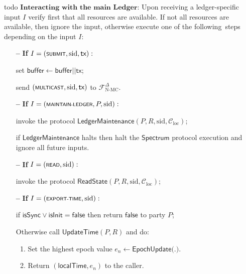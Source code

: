 \begin{protocol}
\begin{algorithmic}
        todo
        \State $\textbf{Interacting with the main Ledger:}$
        Upon receiving a ledger-specific input $I$ verify first that all resources are available.
        If not all resources are available, then ignore the input, otherwise execute one of the following\
        steps depending on the input $I$:
        \begin{itemize}
            \item[\textbf{--}] \textbf{If} $I = (\textsf{\scriptsize{SUBMIT}}, \text{sid}, \textsf{tx}):$
            \item[] set $\textsf{buffer} \leftarrow \textsf{buffer} || \textsf{tx}$;
            \item [] send $(\textsf{\scriptsize{MULTICAST}}, \text{sid}, \textsf{tx})$ to $\mathcal{F}^{\Delta}_{\text{N-MC}}$.
            \item[\textbf{--}] \textbf{If} $I = (\textsf{\scriptsize{MAINTAIN-LEDGER}}, P, \text{sid}):$
            \item[] invoke the protocol \hyperref[apndx:main-ledger-protocol]{$\textsf{LedgerMaintenance}$}$(P, R, \text{sid}, \mathcal{C}_{\text{loc}})$;
            \item[] if $\textsf{LedgerMaintenance}$ halts then halt the $\textsf{Spectrum}$ protocol execution and ignore all future inputs.
            \item[\textbf{--}] \textbf{If} $I = (\textsf{\scriptsize{READ}}, \text{sid}):$
            \item[] invoke the protocol \hyperref[apndx:read-state-protocol]{$\textsf{ReadState}$}$(P, R, \text{sid}, \mathcal{C}_{\text{loc}})$;
            \item[\textbf{--}] \textbf{If} $I = (\textsf{\scriptsize{EXPORT-TIME}}, \text{sid}):$
            \item[] if $\textsf{isSync} \vee \textsf{isInit} = \textsf{false}$ then return $\textsf{false}$ to party $P$;
            \item[] Otherwise call \hyperref[apndx:update-time-protocol]{$\textsf{UpdateTime}$}$(P, R)$ and do:
            \begin{enumerate}
                \item Set the highest epoch value $e_n \leftarrow \textsf{EpochUpdate(.)}$.
                \item Return $(\textsf{localTime}, e_n)$ to the caller.
            \end{enumerate}
        \end{itemize}


\end{algorithmic}
\end{protocol}
